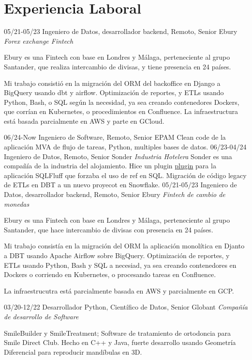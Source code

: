 \section{Experiencia Laboral}

\begin{entrylist}
  \entry
    {05/21-05/23}       
    {Ingeniero de Datos, desarrollador backend, Remoto, Senior}
    {Ebury {\sl Forex exchange Fintech}}
    {Ebury es una Fintech con base en Londres y Málaga, perteneciente al grupo Santander, que realiza intercambio
de divisas, y tiene presencia en 24 países.

     Mi trabajo consistió en la migración del ORM del backoffice en Django a BigQuery usando dbt y airflow. Optimización de reportes, y ETLs usando Python, Bash, o SQL según la necesidad, ya sea creando contenedores Dockers, que corrían en Kubernetes, o procedimientos en Confluence. La infraestructura está basada parcialmente en AWS y parte en GCloud.}
  \entry
    {06/24-Now}
    {Ingeniero de Software, Remoto, Senior}
    {EPAM}
    {Clean code de la aplicación MVA de flujo de tareas, Python, multiples bases de datos.}
  \entry
    {06/23-04/24}
    {Ingeniero de Datos, Remoto, Senior}
    {Sonder {\sl Industria Hotelera}}
        {Sonder es una compañía de la industria del alojamiento. Hice un plugin \href{http:\\https://github.com/juanfejara/sqlfluff-templ-check}{plugin} para la aplicación SQLFluff que forzaba el uso de ref en SQL.
	Migración de código legacy de ETLs en DBT a un nuevo proyecot en Snowflake.}
  \entry
    {05/21-05/23}
    {Ingeniero de Datos, desarrollador backend, Remoto, Senior}
    {Ebury {\sl Fintech de cambio de monedas}}
    {Ebury es una Fintech con base en Londres y Málaga, perteneciente al grupo Santander, que hace intercambio de divisas con presencia en 24 países.

Mi trabajo consistía en la migración del ORM la aplicación monolítica en Djanto a DBT usando Apache Airflow sobre BigQuery. Optimización de reportes, y ETLs usando Python, Bash y SQL a necesiad, ya sea creando contenedores en Dockers o corriendo en Kubernetes, o procesando tareas en Confluence.

	La infraestrucutra está parcialmente basada en AWS y parcialmente en GCP.}
	\entry

    {03/20-12/22}
    {Desarrollador Python, Científico de Datos, Senior}
    {Globant {\sl Compañía de desarrollo de Software}}
	{SmileBuilder y SmileTreatment; Software de tratamiento de ortodoncia para Smile Direct Club. Hecho en C++ y Java,
fuerte desarrollo usando Geometría Diferencial para reproducir mandíbulas en 3D.

}
\end{entrylist}
